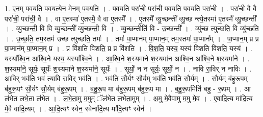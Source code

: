 \documentclass[17pt]{extarticle}
\begin{document}
1. ए॒न॒म् प॒व॒य॒ति॒ प॒व॒य॒त्ये॒न॒ मे॒न॒म् प॒व॒य॒ति॒ । . प॒व॒य॒ति॒ परा॑ची॒ परा॑ची पवयति पवयति॒ परा॑ची । . परा॑ची॒ वै वै परा॑ची॒ परा॑ची॒ वै । . वा ए॒तस्मा॑ ए॒तस्मै॒ वै वा ए॒तस्मै᳚ । . ए॒तस्मै᳚ व्यु॒च्छन्ती᳚ व्यु॒च्छ न्त्ये॒तस्मा॑ ए॒तस्मै᳚ व्यु॒च्छन्ती᳚ । . व्यु॒च्छन्ती॒ वि वि व्यु॒च्छन्ती᳚ व्यु॒च्छन्ती॒ वि । . व्यु॒च्छन्तीति॑ वि - उ॒च्छन्ती᳚ । . व्यु॑च्छ त्युच्छति॒ वि व्यु॑च्छति । . उ॒च्छ॒ति॒ तम॒स्तम॑ उच्छ त्युच्छति॒ तमः॑ । . तमः॑ पा॒प्मान॑म् पा॒प्मान॒म् तम॒स्तमः॑ पा॒प्मान᳚म् । . पा॒प्मान॒म् प्र प्र पा॒प्मान॑म् पा॒प्मान॒म् प्र । . प्र वि॑शति विशति॒ प्र प्र वि॑शति । . वि॒श॒ति॒ यस्य॒ यस्य॑ विशति विशति॒ यस्य॑ । . यस्या᳚श्वि॒न आ᳚श्वि॒ने यस्य॒ यस्या᳚श्वि॒ने । . आ॒श्वि॒ने श॒स्यमा॑ने श॒स्यमा॑न आश्वि॒न आ᳚श्वि॒ने श॒स्यमा॑ने । . श॒स्यमा॑ने॒ सूर्यः॒ सूर्यः॑ श॒स्यमा॑ने श॒स्यमा॑ने॒ सूर्यः॑ । . सूर्यो॒ न न सूर्यः॒ सूर्यो॒ न । . नावि रा॒विर् न नाविः । . आ॒विर् भव॑ति॒ भव॑ त्या॒वि रा॒विर् भव॑ति । . भव॑ति सौ॒र्यꣳ सौ॒र्यम् भव॑ति॒ भव॑ति सौ॒र्यम् । . सौ॒र्यम् ब॑हुरू॒पम् ब॑हुरू॒पꣳ सौ॒र्यꣳ सौ॒र्यम् ब॑हुरू॒पम् । . ब॒हु॒रू॒प मा ब॑हुरू॒पम् ब॑हुरू॒प मा । . ब॒हु॒रू॒पमिति॑ बहु - रू॒पम् । . आ ल॑भेत लभे॒ता ल॑भेत । . ल॒भे॒ता॒मु म॒मुम् ॅल॑भेत लभेता॒मुम् । . अ॒मु मे॒वैवामु म॒मु मे॒व । . ए॒वादि॒त्य मा॑दि॒त्य मे॒वै वादि॒त्यम् । . आ॒दि॒त्यꣳ स्वेन॒ स्वेना॑दि॒त्य मा॑दि॒त्यꣳ स्वेन॑ । \newline
\end{document}
